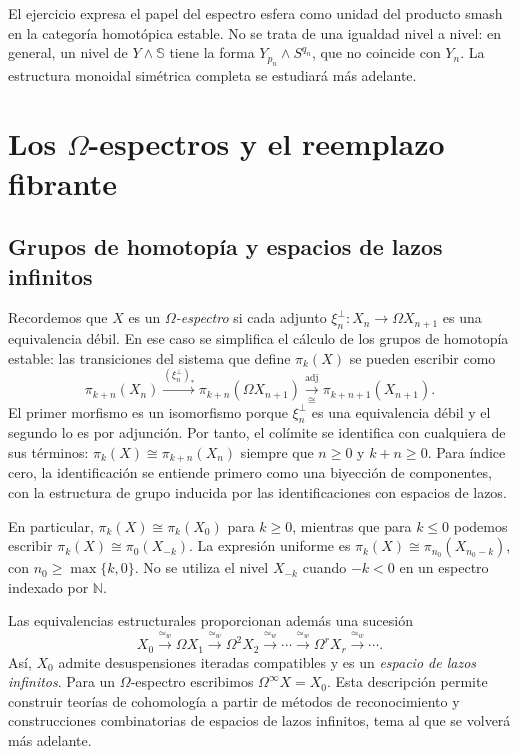 El ejercicio expresa el papel del espectro esfera como unidad del producto smash en la categoría homotópica estable. No se trata de una igualdad nivel a nivel: en general, un nivel de $Y\wedge\mathbb S$ tiene la forma $Y_{p_n}\wedge S^{q_n}$, que no coincide con $Y_n$. La estructura monoidal simétrica completa se estudiará más adelante.

\section{Los \texorpdfstring{$\Omega$}{Omega}-espectros y el reemplazo fibrante}

\subsection{Grupos de homotopía y espacios de lazos infinitos}

Recordemos que $X$ es un \emph{$\Omega$-espectro} si cada adjunto $\xi_n^{\perp}\colon X_n\to\Omega X_{n+1}$ es una equivalencia débil. En ese caso se simplifica el cálculo de los grupos de homotopía estable: las transiciones del sistema que define $\pi_k(X)$ se pueden escribir como
\[
\pi_{k+n}(X_n)
\xrightarrow{(\xi_n^{\perp})_*}
\pi_{k+n}(\Omega X_{n+1})
\xrightarrow[\cong]{\operatorname{adj}}
\pi_{k+n+1}(X_{n+1}).
\]
El primer morfismo es un isomorfismo porque $\xi_n^{\perp}$ es una equivalencia débil y el segundo lo es por adjunción. Por tanto, el colímite se identifica con cualquiera de sus términos: $\pi_k(X)\cong\pi_{k+n}(X_n)$ siempre que $n\ge0$ y $k+n\ge0$. Para índice cero, la identificación se entiende primero como una biyección de componentes, con la estructura de grupo inducida por las identificaciones con espacios de lazos.

En particular, $\pi_k(X)\cong\pi_k(X_0)$ para $k\ge0$, mientras que para $k\le0$ podemos escribir $\pi_k(X)\cong\pi_0(X_{-k})$. La expresión uniforme es $\pi_k(X)\cong\pi_{n_0}(X_{n_0-k})$, con $n_0\ge\max\{k,0\}$. No se utiliza el nivel $X_{-k}$ cuando $-k<0$ en un espectro indexado por $\mathbb N$.

Las equivalencias estructurales proporcionan además una sucesión
\[
X_0\xrightarrow{\simeq_w}\Omega X_1
\xrightarrow{\simeq_w}\Omega^2X_2
\xrightarrow{\simeq_w}\cdots
\xrightarrow{\simeq_w}\Omega^rX_r\xrightarrow{\simeq_w}\cdots.
\]
Así, $X_0$ admite desuspensiones iteradas compatibles y es un \emph{espacio de lazos infinitos}. Para un $\Omega$-espectro escribimos $\Omega^\infty X=X_0$. Esta descripción permite construir teorías de cohomología a partir de métodos de reconocimiento y construcciones combinatorias de espacios de lazos infinitos, tema al que se volverá más adelante.

